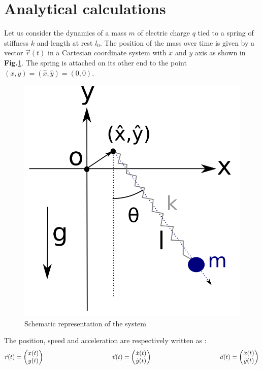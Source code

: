 \section{Analytical calculations}
Let us consider the dynamics of a mass $m$ of electric charge $q$ tied to a spring of stiffness $k$ and length at rest $l_0$. The position of the mass over time is given by a vector $\Vec{r}(t)$ in a Cartesian coordinate system with $x$ and $y$ axis as shown in \textbf{Fig.}\ref{lab1}. The spring is attached on its other end to the point $(x,y)=(\widehat{x},\widehat{y})=(0,0)$.
\begin{figure}[H]
    \centering
    \includegraphics[scale=0.4]{Images/img1.png}
    \caption{Schematic representation of the system }%
    \label{lab1}
\end{figure}
The position, speed and acceleration are respectively written as : 
\begin{equation*}
    \Vec{r}(t)=
\begin{pmatrix}
    x(t) \\
    y(t)
\end{pmatrix}
\hspace{3.8cm}
    \Vec{v}(t)=
\begin{pmatrix}
    \dot{x}(t) \\
    \dot{y}(t)
\end{pmatrix}
\hspace{3.8cm}
    \Vec{a}(t)=
\begin{pmatrix}
    \ddot{x}(t) \\
    \ddot{y}(t)
\end{pmatrix}
\end{equation*}
